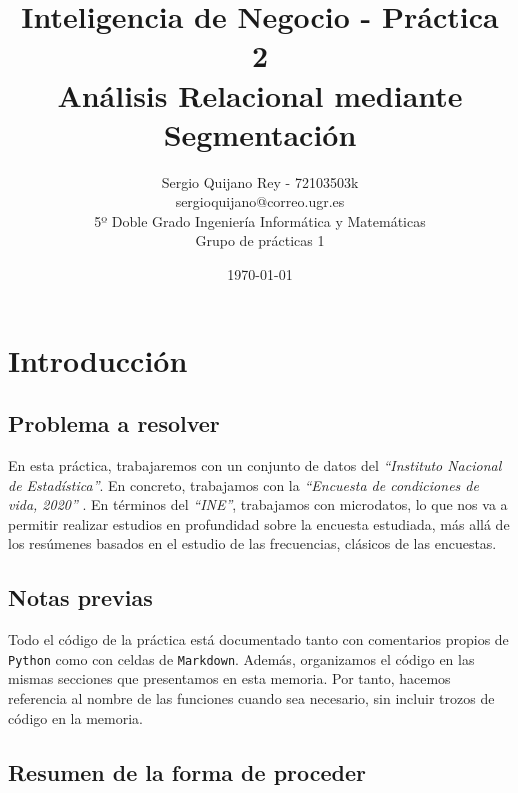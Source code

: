 \documentclass[11pt]{article}
\title{
    {Inteligencia de Negocio - Práctica 2} \\
    {Análisis Relacional mediante Segmentación}
}
\author{
    {Sergio Quijano Rey - 72103503k}\\
    {sergioquijano@correo.ugr.es} \\
    {5º Doble Grado Ingeniería Informática y Matemáticas} \\
    {Grupo de prácticas 1}
}
\date{\today}
\newcommand{\entrecomillado}[1]{\emph{``#1''}}
\begin{document}
\maketitle
\pagebreak

\tableofcontents


\listoffigures


{}

\pagebreak

\section{Introducción}

\subsection{Problema a resolver}

En esta práctica, trabajaremos con un conjunto de datos del \entrecomillado{Instituto Nacional de Estadística}. En concreto, trabajamos con la \entrecomillado{Encuesta de condiciones de vida, 2020} \cite{original_dataset:online}. En términos del \entrecomillado{INE}, trabajamos con microdatos, lo que nos va a permitir realizar estudios en profundidad sobre la encuesta estudiada, más allá de los resúmenes basados en el estudio de las frecuencias, clásicos de las encuestas.

\subsection{Notas previas}

Todo el código de la práctica está documentado tanto con comentarios propios de \lstinline{Python} como con celdas de \lstinline{Markdown}. Además, organizamos el código en las mismas secciones que presentamos en esta memoria. Por tanto, hacemos referencia al nombre de las funciones cuando sea necesario, sin incluir trozos de código en la memoria.

\subsection{Resumen de la forma de proceder}
\end{document}

